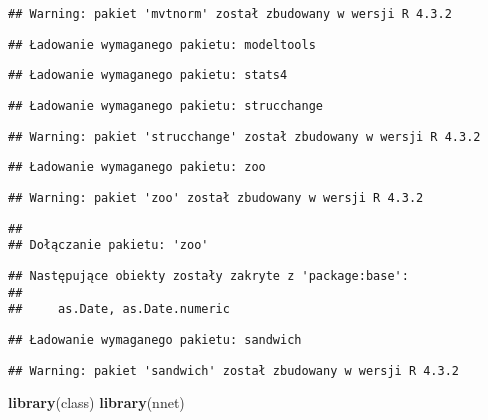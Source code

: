 \documentclass[
]{article}
\newenvironment{Shaded}{\begin{snugshade}}{\end{snugshade}}
\newcommand{\FunctionTok}[1]{\textcolor[rgb]{0.13,0.29,0.53}{\textbf{#1}}}
\newcommand{\NormalTok}[1]{#1}
\begin{document}
\begin{verbatim}
## Warning: pakiet 'mvtnorm' został zbudowany w wersji R 4.3.2
\end{verbatim}

\begin{verbatim}
## Ładowanie wymaganego pakietu: modeltools
\end{verbatim}

\begin{verbatim}
## Ładowanie wymaganego pakietu: stats4
\end{verbatim}

\begin{verbatim}
## Ładowanie wymaganego pakietu: strucchange
\end{verbatim}

\begin{verbatim}
## Warning: pakiet 'strucchange' został zbudowany w wersji R 4.3.2
\end{verbatim}

\begin{verbatim}
## Ładowanie wymaganego pakietu: zoo
\end{verbatim}

\begin{verbatim}
## Warning: pakiet 'zoo' został zbudowany w wersji R 4.3.2
\end{verbatim}

\begin{verbatim}
## 
## Dołączanie pakietu: 'zoo'
\end{verbatim}

\begin{verbatim}
## Następujące obiekty zostały zakryte z 'package:base':
## 
##     as.Date, as.Date.numeric
\end{verbatim}

\begin{verbatim}
## Ładowanie wymaganego pakietu: sandwich
\end{verbatim}

\begin{verbatim}
## Warning: pakiet 'sandwich' został zbudowany w wersji R 4.3.2
\end{verbatim}

\begin{Shaded}
\begin{Highlighting}[]
\FunctionTok{library}\NormalTok{(class)}
\FunctionTok{library}\NormalTok{(nnet)}
\end{Highlighting}
\end{Shaded}
\end{document}
